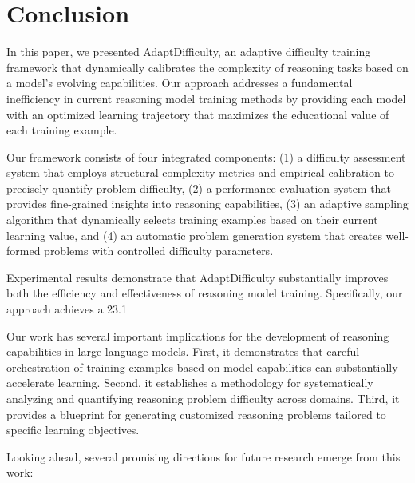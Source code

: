 \section{Conclusion}

In this paper, we presented AdaptDifficulty, an adaptive difficulty training framework that dynamically calibrates the complexity of reasoning tasks based on a model's evolving capabilities. Our approach addresses a fundamental inefficiency in current reasoning model training methods by providing each model with an optimized learning trajectory that maximizes the educational value of each training example.

Our framework consists of four integrated components: (1) a difficulty assessment system that employs structural complexity metrics and empirical calibration to precisely quantify problem difficulty, (2) a performance evaluation system that provides fine-grained insights into reasoning capabilities, (3) an adaptive sampling algorithm that dynamically selects training examples based on their current learning value, and (4) an automatic problem generation system that creates well-formed problems with controlled difficulty parameters.

Experimental results demonstrate that AdaptDifficulty substantially improves both the efficiency and effectiveness of reasoning model training. Specifically, our approach achieves a 23.1%

Our work has several important implications for the development of reasoning capabilities in large language models. First, it demonstrates that careful orchestration of training examples based on model capabilities can substantially accelerate learning. Second, it establishes a methodology for systematically analyzing and quantifying reasoning problem difficulty across domains. Third, it provides a blueprint for generating customized reasoning problems tailored to specific learning objectives.

Looking ahead, several promising directions for future research emerge from this work:

